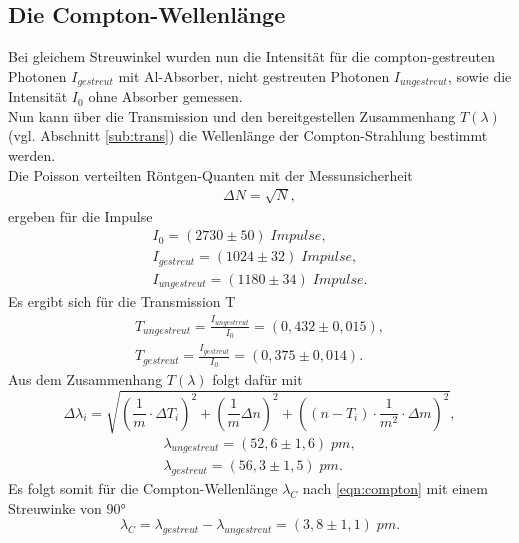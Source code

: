 \subsection{Die Compton-Wellenlänge}
Bei gleichem Streuwinkel wurden nun die Intensität für die compton-gestreuten Photonen
$I_{gestreut}$ mit Al-Absorber, nicht gestreuten Photonen $I_{ungestreut}$, sowie 
die Intensität $I_0$ ohne Absorber gemessen.\\
Nun kann über die Transmission und den bereitgestellen Zusammenhang $T(\lambda)$ (vgl. Abschnitt \ref{sub:trans})
die Wellenlänge der Compton-Strahlung bestimmt werden.\\
Die Poisson verteilten Röntgen-Quanten mit der Messunsicherheit\\
\begin{align*}
    \Delta N= \sqrt{N},
\end{align*}
ergeben für die Impulse
\begin{align*}
    I_0=(2730\pm50)\;\si{Impulse},\\
    I_{gestreut}=(1024\pm32)\;\si{Impulse},\\
    I_{ungestreut}=(1180\pm34)\;\si{Impulse}.
\end{align*}
Es ergibt sich für die Transmission T
\begin{align*}
    T_{ungestreut}=\frac{I_{ungestreut}}{I_{0}}=(0,432\pm0,015),\\
    T_{gestreut}=\frac{I_{gestreut}}{I_{0}}=(0,375\pm0,014).
\end{align*}
Aus dem Zusammenhang $T(\lambda)$ folgt dafür mit
\begin{equation*}
    \Delta \lambda_i=\sqrt{\left(\frac{1}{m}\cdot\Delta T_i\right)^2+\left(\frac{1}{m}\Delta n\right)^2+\left((n-T_i)\cdot \frac{1}{m^2} \cdot \Delta m \right)^2},
\end{equation*}
\begin{align*}
    \lambda_{ungestreut}=(52,6\pm1,6)\;\si{pm},\\
    \lambda_{gestreut}=(56,3\pm1,5)\;\si{pm}.
\end{align*}
Es folgt somit für die Compton-Wellenlänge $\lambda_C$ nach \ref{eqn:compton} mit
einem Streuwinke von $90$°
\begin{equation}
    \lambda_C=\lambda_{gestreut}-\lambda_{ungestreut}=(3,8\pm1,1)\;\si{pm}.
    \label{eqn:welln}
\end{equation}
\label{sec:Auswertung}
